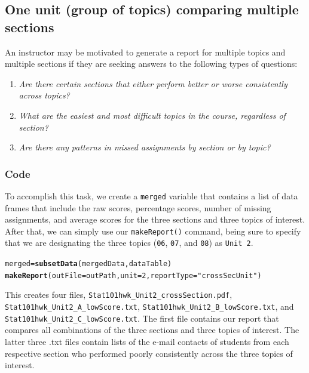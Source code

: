 \documentclass{article}\usepackage[]{graphicx}\usepackage[]{color}
\makeatletter
\newcommand{\hlnum}[1]{\textcolor[rgb]{0.686,0.059,0.569}{#1}}%
\newcommand{\hlstr}[1]{\textcolor[rgb]{0.192,0.494,0.8}{#1}}%
\newcommand{\hlstd}[1]{\textcolor[rgb]{0.345,0.345,0.345}{#1}}%
\newcommand{\hlkwb}[1]{\textcolor[rgb]{0.69,0.353,0.396}{#1}}%
\newcommand{\hlkwc}[1]{\textcolor[rgb]{0.333,0.667,0.333}{#1}}%
\newcommand{\hlkwd}[1]{\textcolor[rgb]{0.737,0.353,0.396}{\textbf{#1}}}%
\newenvironment{kframe}{%
 \def\at@end@of@kframe{}%
 \ifinner\ifhmode%
  \def\at@end@of@kframe{\end{minipage}}%
  \begin{minipage}{\columnwidth}%
 \fi\fi%
 \def\FrameCommand##1{\hskip\@totalleftmargin \hskip-\fboxsep
 \colorbox{shadecolor}{##1}\hskip-\fboxsep
     \hskip-\linewidth \hskip-\@totalleftmargin \hskip\columnwidth}%
 \MakeFramed {\advance\hsize-\width
   \@totalleftmargin\z@ \linewidth\hsize
   \@setminipage}}%
 {\par\unskip\endMakeFramed%
 \at@end@of@kframe}
\newenvironment{knitrout}{}{} %
\numberwithin{equation}{section} %
\makeatother
\begin{document}
\subsection{One unit (group of topics) comparing multiple sections}

An instructor may be motivated to generate a report for multiple topics and multiple sections if they are seeking answers to the following types of questions:

\begin{enumerate}
\item \textit{Are there certain sections that either perform better or worse consistently across topics?}
\item \textit{What are the easiest and most difficult topics in the course, regardless of section?}
\item \textit{Are there any patterns in missed assignments by section or by topic?}
\end{enumerate}

\subsubsection{Code}
\label{sec:crossSecU}

To accomplish this task, we create a \texttt{merged} variable that contains a list of data frames that include the raw scores, percentage scores, number of missing assignments, and average scores for the three sections and three topics of interest. After that, we can simply use our \texttt{makeReport()} command, being sure to specify that we are designating the three topics (\texttt{06}, \texttt{07}, and \texttt{08}) as \texttt{Unit 2}. \\

\begin{knitrout}
\color{fgcolor}\begin{kframe}
\begin{alltt}
\hlstd{merged} \hlkwb{=} \hlkwd{subsetData}\hlstd{(mergedData, dataTable)}
\hlkwd{makeReport}\hlstd{(}\hlkwc{outFile} \hlstd{= outPath,} \hlkwc{unit} \hlstd{=} \hlnum{2}\hlstd{,} \hlkwc{reportType} \hlstd{=} \hlstr{"crossSecUnit"}\hlstd{)}
\end{alltt}
\end{kframe}
\end{knitrout}

This creates four files, \texttt{Stat101hwk\_Unit2\_crossSection.pdf}, \texttt{Stat101hwk\_Unit2\_A\_lowScore.txt}, \texttt{Stat101hwk\_Unit2\_B\_lowScore.txt}, and \texttt{Stat101hwk\_Unit2\_C\_lowScore.txt}. The first file contains our report that compares all combinations of the three sections and three topics of interest. The latter three .txt files contain lists of the e-mail contacts of students from each respective section who performed poorly consistently across the three topics of interest.
\end{document}
